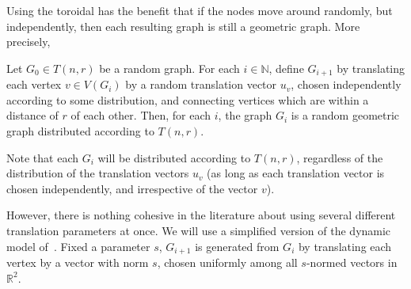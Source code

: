 Using the toroidal has the benefit that
if the nodes move around randomly, but independently,
then each resulting graph is still a geometric graph.
More precisely,

\begin{proposition}
	Let $G_0 \in T(n, r)$ be a random graph.
	For each $i \in \mathbb N$,
	define $G_{i+1}$ by translating each vertex $v \in V(G_i)$
	by a random translation vector $u_v$,
	chosen independently according to some distribution,
	and connecting vertices which are within a distance of $r$ of each other.
	Then, for each $i$,
	the graph $G_i$ is a random geometric graph distributed according to $T(n, r)$.
\end{proposition}

Note that each $G_i$ will be distributed according to $T(n, r)$,
regardless of the distribution of the translation vectors $u_v$
(as long as each translation vector is chosen independently,
and irrespective of the vector $v$).


However,
there is nothing cohesive in the literature about using several different
translation parameters at once.
We will use a simplified version of the dynamic model of~\cite{Diaz2008}.
Fixed a parameter $s$,
$G_{i+1}$ is generated from $G_i$
by translating each vertex by a vector with norm $s$,
chosen uniformly among all $s$-normed vectors in $\mathbb R^2$.
